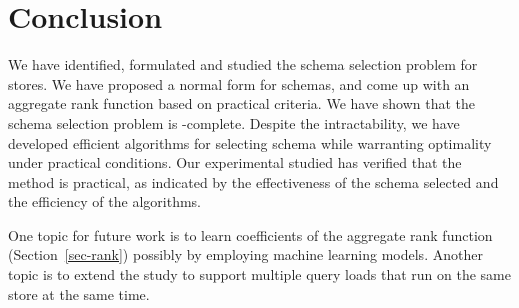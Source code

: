 \vspace{-0.3ex}
\section{Conclusion}
\label{sec-conclude}
\vspace{-0.4ex}

We have identified, formulated and studied the \baav schema selection
problem for \kv stores. We have proposed a normal form for \baav schemas,
and come up with an aggregate rank function based on %
practical
criteria. We have shown that the schema selection problem is
\NP-complete. Despite the intractability, we have developed
efficient algorithms for selecting \baav schema while warranting
optimality under practical conditions. Our experimental studied
has verified that the method is practical, as indicated by
the effectiveness of the \baav schema selected
and the efficiency of the algorithms.

One topic for future work is to learn coefficients of the aggregate
rank function (Section~\ref{sec-rank}) possibly by employing
machine
learning models. Another topic is to extend the study to
support multiple query loads that run on the same \kv store at the same time.
